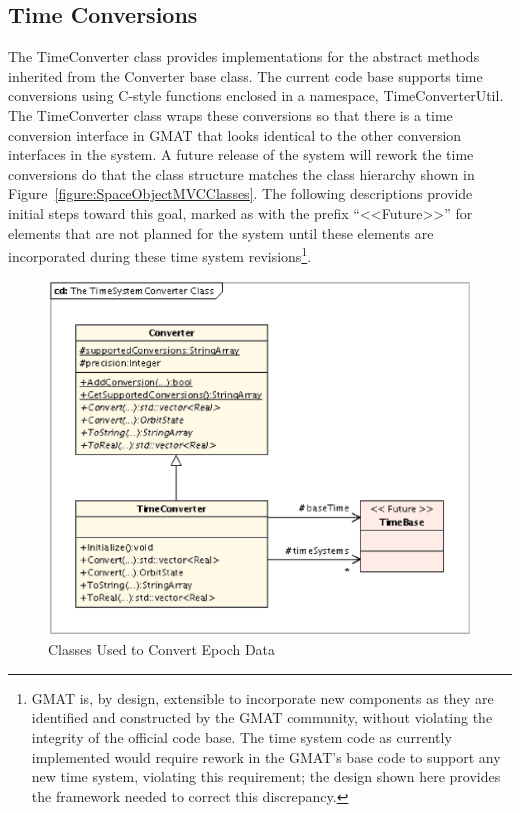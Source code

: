 \subsection{Time Conversions}

The TimeConverter class provides implementations for the abstract methods inherited from the
Converter base class.  The current code base supports time conversions using C-style functions
enclosed in a namespace, TimeConverterUtil.  The TimeConverter class wraps these conversions so
that there is a time conversion interface in GMAT that looks identical to the other conversion
interfaces in the system.  A future release of the system will rework the time conversions do that
the class structure matches the class hierarchy shown in Figure~\ref{figure:SpaceObjectMVCClasses}.
 The following descriptions provide initial steps toward this goal, marked as with the prefix
``<<Future>>'' for elements that are not planned for the system until these elements are
incorporated during these time system revisions\footnote{GMAT is, by design, extensible to
incorporate new components as they are identified and constructed by the GMAT community, without
violating the integrity of the official code base. The time system code as currently implemented
would require rework in the GMAT's base code to support any new time system, violating this
requirement; the design shown here provides the framework needed to correct this discrepancy.}.

\begin{figure}[htb]
\begin{center}
\includegraphics[scale=0.5]{Images/TheTimeSystemConverterClass.eps}
\caption{\label{figure:TimeConverterClasses}Classes Used to Convert Epoch Data}
\end{center}
\end{figure}

